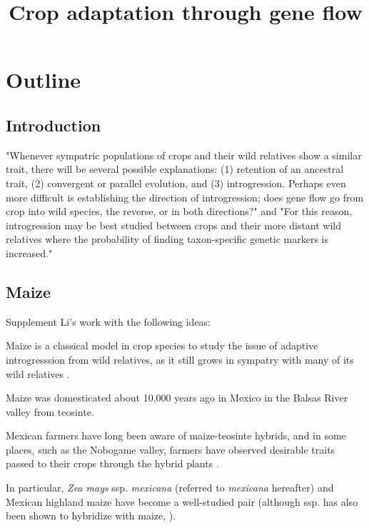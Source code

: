 \documentclass[11pt]{article}
\title{Crop adaptation through gene flow}
\begin{document}
\maketitle

\section*{Outline}

\subsection*{Introduction}

 "Whenever sympatric populations of crops and their wild relatives show a similar trait, there will be several possible explanations: (1) retention of an ancestral trait, (2) convergent or parallel evolution, and (3) introgression.  Perhaps even more difficult is establishing the direction of introgression; does gene flow go from crop into wild species, the reverse, or in both directions?" and "For this reason, introgression may be best studied between crops and their more distant wild relatives where the probability of finding taxon-specific genetic markers is increased." \cite{doebley1990molecular}

\subsection*{Maize}


Supplement Li's work with the following ideas:


Maize is a classical model in crop species to study the issue of adaptive introgresssion from wild relatives, as it still grows in sympatry with many of its wild relatives \cite{hufford2013}.

Maize was domesticated about 10,000 years ago in Mexico \cite{smith1997initial} \cite{hufford2012comparative} in the Balsas River valley \cite {matsuoka2002single} from teosinte.

Mexican farmers have long been aware of maize-teosinte hybrids, and in some places, such as the Nobogame valley, farmers have observed desirable traits passed to their crops through the hybrid plants \cite{wilkes1977hybridization} \cite{lumholtz1902unknown} \cite{wilkes1970teosinte}.

In particular, \emph{Zea mays} ssp. \emph{mexicana} (referred to \emph{mexicana} hereafter) and Mexican highland maize have become a well-studied pair (although ssp.  has also been shown to hybridize with maize, \cite{wilkes1977hybridization}).
\end{document}
